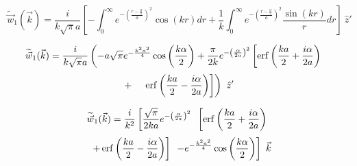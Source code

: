 \documentclass[double,12pt]{beavtex}
\begin{document}
\begin{equation}{\widetilde{\vec{w}}_1(\vec{k})=\frac{i}{k\sqrt{\pi}a}\left[-\int_{0}^{\infty}e^{-\left(\frac{r-\frac{\alpha}{2}}{a}\right)^2}\cos(kr)d{r}+\frac{1}{k}\int_{0}^{\infty}e^{-\left(\frac{r-\frac{\alpha}{2}}{a}\right)^2}\frac{\sin(kr)}{r}d{r}\right]{~}\hat{z}'}\end{equation}

\begin{equation}
   \widetilde{\vec{w}}_1(\vec{k})=\frac{i}{k\sqrt{\pi}a}\left(-a\sqrt{\pi}e^{-\frac{k^2a^2}{4}}
   \cos\left(\frac{k\alpha}{2}\right)+\frac{\pi}{2k}e^{-\left(\frac{\alpha}{2a}\right)^2}
   \left[\operatorname{erf}\left(\frac{ka}{2}+\frac{i\alpha}{2a}\right)\color{white}
   \right]\color{white}\right)\color{black}  \nonumber
\end{equation} 
\begin{equation}
   +\color{white}\left(\left[\color{black}\operatorname{erf}
   \left(\frac{ka}{2}-\frac{i\alpha}{2a}\right)\right]\color{black}\right)
   \color{black}{~}\hat{z}'
\end{equation} 

\begin{equation}
   \widetilde{\vec{w}}_1(\vec{k}) = \frac{i}{k^2}\left[\frac{\sqrt{\pi}}{2ka}
   e^{-\left(\frac{\alpha}{2a}\right)^2}\color{white}\right]\color{black}
   \left[\operatorname{erf}\left(\frac{ka}{2}+\frac{i\alpha}{2a}\right)
   \color{white}\right]\color{black}  \nonumber
\end{equation} 
\begin{equation}  
   \color{white}\left[\color{black} +\operatorname{erf}\left(\frac{ka}{2}
   -\frac{i\alpha}{2a}\right)\right]\color{white}\left[\color{black}
   -e^{-\frac{k^2a^2}{4}}\cos\left(\frac{k\alpha}{2}\right)\right]\color{black}{~}\vec k 
\end{equation}
\end{document}
